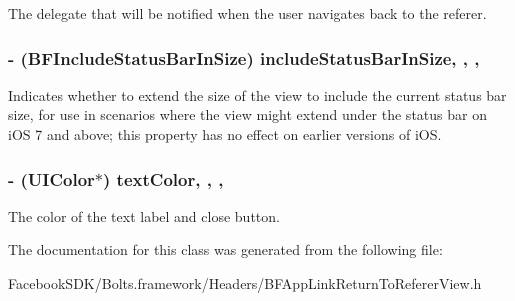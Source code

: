 The delegate that will be notified when the user navigates back to the referer. \hypertarget{interface_b_f_app_link_return_to_referer_view_a640b53f5c49f1bfb5f11a81a8f7381af}{
\subsubsection[{include\-Status\-Bar\-In\-Size}]{\setlength{\rightskip}{0pt plus 5cm}-\/ (B\-F\-Include\-Status\-Bar\-In\-Size) include\-Status\-Bar\-In\-Size\hspace{0.3cm}{\ttfamily [read]}, {\ttfamily [write]}, {\ttfamily [nonatomic]}, {\ttfamily [assign]}}}\label{interface_b_f_app_link_return_to_referer_view_a640b53f5c49f1bfb5f11a81a8f7381af}
Indicates whether to extend the size of the view to include the current status bar size, for use in scenarios where the view might extend under the status bar on i\-O\-S 7 and above; this property has no effect on earlier versions of i\-O\-S. \hypertarget{interface_b_f_app_link_return_to_referer_view_acef579105c567f8f22a2604ea388a37b}{
\subsubsection[{text\-Color}]{\setlength{\rightskip}{0pt plus 5cm}-\/ (U\-I\-Color$\ast$) text\-Color\hspace{0.3cm}{\ttfamily [read]}, {\ttfamily [write]}, {\ttfamily [nonatomic]}, {\ttfamily [strong]}}}\label{interface_b_f_app_link_return_to_referer_view_acef579105c567f8f22a2604ea388a37b}
The color of the text label and close button. 

The documentation for this class was generated from the following file\-:\begin{DoxyCompactItemize}
\item 
Facebook\-S\-D\-K/\-Bolts.\-framework/\-Headers/B\-F\-App\-Link\-Return\-To\-Referer\-View.\-h\end{DoxyCompactItemize}
